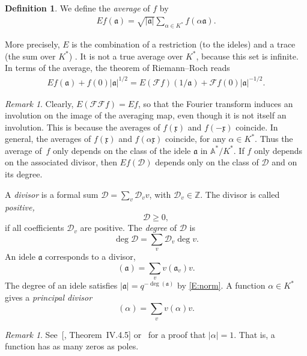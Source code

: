\documentclass{amsart}
\newcommand\Z{\mathbb{Z}}	\newcommand\C{\mathbb{C}}
\newcommand\Fo{\mathcal{F}}
\newcommand\A{\mathbb{A}}
\newcommand\x{\mathfrak{x}}	\newcommand\y{\mathfrak{y}}
\newcommand\calD{\mathcal{D}}	\newcommand\calK{\mathcal{K}}
\newcommand\gota{\mathfrak{a}}	\newcommand\gotb{\mathfrak{b}}
\theoremstyle{definition}\newtheorem{definition}[theorem]{Definition}
\theoremstyle{remark}\newtheorem{remark}[theorem]{Remark}
\numberwithin{equation}{section}
\begin{document}
\begin{definition}\label{D: E}
We define the {\em average\/} of\/ $f$ by
\begin{gather*}
Ef(\gota)=\sqrt{|\gota|}\sum_{\alpha\in K^*}f(\alpha\gota).
\end{gather*}
\end{definition}

More precisely,
 $E$ is the combination of a restriction (to the ideles) and a trace (the sum over $K^*$) \cite{Connespersonal}.
It is not a true average over $K^*$,
because this set is infinite.
In terms of the average,
the theorem of Riemann--Roch reads
\begin{gather}\label{E: Poisson E}
Ef(\gota)+f(0){|\gota|^{1/2}}=E(\Fo f)(1/\gota)+\Fo f(0)|\gota|^{-1/2}.
\end{gather}

\begin{remark}\label{R:F is involution}
Clearly,
$E(\Fo\Fo f)=Ef$,
so that the Fourier transform induces an involution on the image of the averaging map,
even though it is not itself an involution.
This is because the averages of $f(\x)$ and $f(-\x)$ coincide.
In general,
 the averages of $f(\x)$ and $f(\alpha\x)$ coincide,
for any $\alpha\in K^*$.
Thus the average of~$f$ only depends on the class of the idele $\gota$ in $\A^*/K^*$.
If $f$ only depends on the associated divisor,
then $Ef(\calD)$ depends only on the class of $\calD$ and on its degree.
\end{remark}

A {\em divisor\/} is a formal sum $\calD=\sum_v\calD_vv$,
with $\calD_v\in\Z$.
The divisor is called {\em positive,\/}
$$
\calD\geq0,
$$
if all coefficients $\calD_v$ are positive.
The {\em degree\/} of $\calD$ is
$$
\deg\calD=\sum_v\calD_v\deg v.
$$
An idele $\gota$ corresponds to a divisor,
$$
(\gota)=\sum_vv(\gota_v)v.
$$
The degree of an idele satisfies $|\gota|=q^{-\deg(\gota)}$ by \eqref{E:norm}.
A function $\alpha\in K^*$ gives a {\em principal divisor\/}
$$
(\alpha)=\sum_vv(\alpha)v.
$$

\begin{remark}\label{R:zeros=poles}
See~[, Theorem~IV.4.5] or~\cite[Lemma~7]{Iwasawa} for a proof that $|\alpha|=1$.
That is,
a function has as many zeros as poles.
\end{remark}
\end{document}
